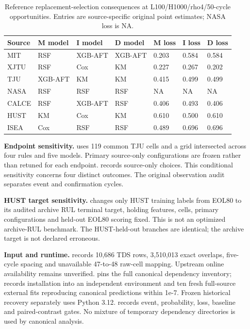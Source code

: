 \documentclass[10pt,a4paper]{article}
\begin{document}
\begin{table}[H]\centering\scriptsize
\caption{Reference replacement-selection consequences at L100/H1000/rho4/50-cycle opportunities. Entries are source-specific original point estimates; NASA loss is NA.}\label{tab:S11}
\begin{tabular*}{\linewidth}{@{\extracolsep{\fill}}lllllll}\toprule
Source & M model & I model & D model & M loss & I loss & D loss\\\midrule
MIT & RSF & XGB-AFT & XGB-AFT & 0.203 & 0.584 & 0.584\\
XJTU & RSF & Cox & KM & 0.227 & 0.267 & 0.202\\
TJU & XGB-AFT & KM & KM & 0.415 & 0.499 & 0.499\\
NASA & RSF & RSF & RSF & NA & NA & NA\\
CALCE & RSF & XGB-AFT & RSF & 0.406 & 0.493 & 0.406\\
HUST & KM & Cox & KM & 0.610 & 0.500 & 0.610\\
ISEA & Cox & RSF & RSF & 0.489 & 0.696 & 0.696\\
\bottomrule\end{tabular*}\end{table}

\textbf{Endpoint sensitivity.}  uses 119 common TJU cells and a grid intersected across four rules and five models. Primary source-only configurations are frozen rather than retuned for each endpoint.  records source-only choices. This conditional sensitivity concerns four distinct outcomes. The original observation audit separates event and confirmation cycles.

\textbf{HUST target sensitivity.}  changes only HUST training labels from EOL80 to its audited archive RUL terminal target, holding features, cells, primary configurations and held-out EOL80 scoring fixed. This is not an optimized archive-RUL benchmark. The HUST-held-out branches are identical; the archive target is not declared erroneous.

\textbf{Input and runtime.}  records 10,686 TDS rows, 3,510,013 exact overlaps, five-cycle spacing and unavailable 47-to-48 raw-cell mapping. Upstream online availability remains unverified.  pins the full canonical dependency inventory;  records installation into an independent environment and ten fresh full-source external fits reproducing canonical predictions within 1e-7. Frozen historical recovery separately uses Python 3.12.  records event, probability, loss, baseline and paired-contrast gates. No mixture of temporary dependency directories is used by canonical analysis.
\end{document}
